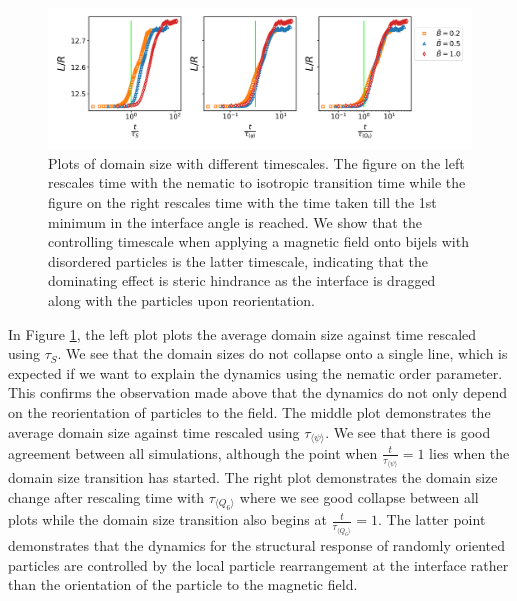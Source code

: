 \begin{figure} 
    \centering 
    \includegraphics{../figures/results/paper2/domain_size-field_on-scaled.png} 
    \caption{Plots of domain size with different timescales. The figure on the left rescales time with the nematic to 
            isotropic transition time while the figure on the right rescales time with the time taken till the 1st minimum in 
            the interface angle is reached. We show that the controlling timescale when applying a magnetic field onto bijels 
            with disordered particles is the latter timescale, indicating that the dominating effect is steric hindrance as the 
            interface is dragged along with the particles upon reorientation.} 
    \label{fig:domain_size-field_on-scaled} 
\end{figure}

In Figure \ref{fig:domain_size-field_on-scaled}, the left plot plots the average domain size against time rescaled 
using $\tau_S$. We see that the domain sizes do not collapse onto a single line, which is expected if we want to 
explain the dynamics using the nematic order parameter. This confirms the observation made above that the dynamics 
do not only depend on the reorientation of particles to the field. The middle plot demonstrates the average domain 
size against time rescaled using $\tau_{\langle \psi \rangle}$. We see that there is good agreement between all 
simulations, although the point when $\frac{t}{\tau_{\langle \psi \rangle}} = 1$ lies when the domain size transition 
has started. The right plot demonstrates the domain size change after rescaling time with $\tau_{\langle Q_6 \rangle}$ 
where we see good collapse between all plots while the domain size transition also begins at 
$\frac{t}{\tau_{\langle Q_6 \rangle}} = 1$. The latter point demonstrates that the dynamics for the 
structural response of randomly oriented particles are controlled by the local particle rearrangement at the 
interface rather than the orientation of the particle to the magnetic field.

